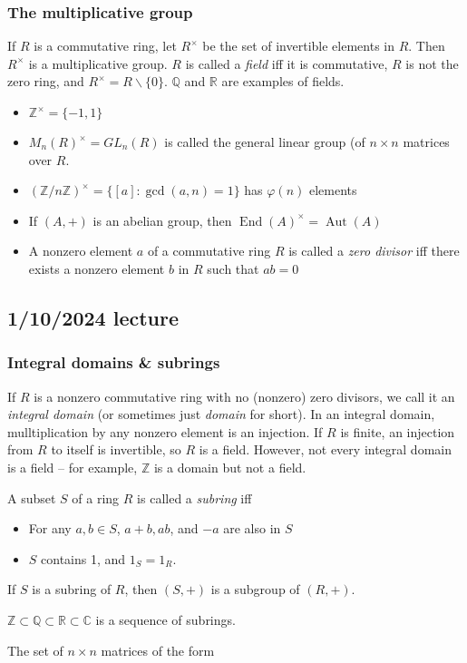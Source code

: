 \documentclass[12pt]{article}
\begin{document}
\subsubsection{The multiplicative group}
If $R$ is a commutative ring, let $R^\times$ be the set of invertible elements in $R$. Then $R^\times$ is a multiplicative group. $R$ is called a \textit{field} iff it is commutative, $R$ is not the zero ring, and $R^\times = R \backslash \{0\}$. $ \mathbb{Q}$ and $ \mathbb{R}$ are examples of fields.
\par
\begin{itemize}
    \item $ \mathbb{Z}^\times = \{-1, 1\}$
    \item $M_n(R)^\times = GL_n(R)$ is called the general linear group (of $n \times n$ matrices over $R$.
    \item $( \mathbb{Z}/n \mathbb{Z})^\times = \{[a]: \operatorname{gcd}(a,n)=1\}$ has $\varphi(n)$ elements
    \item If $(A,+)$ is an abelian group, then $\operatorname{End}(A)^\times = \operatorname{Aut}(A)$
    \item A nonzero element $a$ of a commutative ring $R$ is called a \textit{zero divisor} iff there exists a nonzero element $b$ in $R$ such that $ab=0$
\end{itemize}

\subsection{1/10/2024 lecture}
\subsubsection{Integral domains \& subrings}
If $R$ is a nonzero commutative ring with no (nonzero) zero divisors, we call it an \textit{integral domain} (or sometimes just \textit{domain} for short). In an integral domain, mulltiplication by any nonzero element is an injection. If $R$ is finite, an injection from $R$ to itself is invertible, so $R$ is a field. However, not every integral domain is a field -- for example, $ \mathbb{Z} $ is a domain but not a field.
\par
A subset $S$ of a ring $R$ is called a \textit{subring} iff
\begin{itemize}
    \item For any $a,b \in S$, $a+b, ab$, and $-a$ are also in $S$
    \item $S$ contains 1, and $1_S=1_R$.
\end{itemize}
If $S$ is a subring of $R$, then $(S,+)$ is a subgroup of $(R,+)$.
\par
$ \mathbb{Z} \subset \mathbb{Q} \subset \mathbb{R} \subset \mathbb{C}$ is a sequence of subrings.
\par
The set of $n \times n$ matrices of the form
\end{document}
